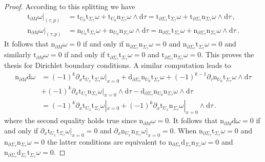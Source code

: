 \begin{proof}
	According to this splitting we have
	\begin{align*}
	\mathrm{t}_{\partial M}\omega|_{(\tau,p)}&=
	\mathrm{t}_{U_0}\mathrm{t}_{\Sigma_\tau}\omega+
	\mathrm{t}_{U_0}\mathrm{n}_{\Sigma_\tau}\omega\wedge\mathrm{d}\tau=
	\mathrm{t}_{\partial\Sigma_\tau}\mathrm{t}_{\Sigma_\tau}\omega+
	\mathrm{t}_{\partial\Sigma_\tau}\mathrm{n}_{\Sigma_\tau}\omega\wedge\mathrm{d}\tau\,,\\
	\mathrm{n}_{\partial M}\omega|_{(\tau,p)}&=
	\mathrm{n}_{U_0}\mathrm{t}_{\Sigma_{\tau}}\omega+
	\mathrm{n}_{U_0}\mathrm{n}_{\Sigma_\tau}\omega\wedge\mathrm{d}\tau=
	\mathrm{n}_{\partial\Sigma_\tau}\mathrm{t}_{\Sigma_\tau}\omega+
	\mathrm{n}_{\partial\Sigma_\tau}\mathrm{n}_{\Sigma_\tau}\omega\wedge\mathrm{d}\tau\,.
	\end{align*}
	It follows that $\mathrm{n}_{\partial M}\omega=0$ if and only if $\mathrm{n}_{\partial\Sigma_\tau}\mathrm{n}_{\Sigma_\tau}\omega=0$ and $\mathrm{n}_{\partial\Sigma_\tau}\mathrm{t}_{\Sigma_\tau}\omega=0$ and similarly $\mathrm{t}_{\partial M}\omega=0$ if and only if $\mathrm{t}_{\partial\Sigma_\tau}\mathrm{t}_{\Sigma_\tau}\omega=0$ and $\mathrm{t}_{\partial\Sigma_\tau}\mathrm{n}_{\Sigma_\tau}\omega=0$. This proves the thesis for Dirichlet boundary conditions. A similar computation leads to
	\begin{align*}
	\mathrm{n}_{\partial M}\mathrm{d}\omega&=
	(-1)^k\partial_x\mathrm{t}_{U_x}\mathrm{t}_{\Sigma_\tau}\omega|_{x=0}+
	\mathrm{d}_{\partial\Sigma_\tau}\mathrm{n}_{U_0}\mathrm{t}_{\Sigma_\tau}\omega+
	(-1)^{k-1}\partial_\tau\mathrm{n}_{U_0}\mathrm{t}_{\Sigma_\tau}\omega\wedge\mathrm{d}\tau\\&+
	(-1)^k\partial_x\mathrm{t}_{U_x}\mathrm{n}_{\Sigma_\tau}\omega|_{x=0}\wedge\mathrm{d}\tau-
	\mathrm{d}_{\partial\Sigma_\tau}\mathrm{n}_{U_0}\mathrm{n}_{\Sigma_\tau}\omega\wedge\mathrm{d}\tau\\&=
	(-1)^k\partial_x\mathrm{t}_{U_x}\mathrm{t}_{\Sigma_\tau}\omega|_{x=0}+
	(-1)^k\partial_x\mathrm{t}_{U_x}\mathrm{n}_{\Sigma_\tau}\omega|_{x=0}\wedge\mathrm{d}\tau\,.
	\end{align*}
	where the second equality holds true since $\mathrm{n}_{\partial M}\omega=0$.
	It follows that $\mathrm{n}_{\partial M}\mathrm{d}\omega=0$ if and only if $\partial_x\mathrm{t}_{U_x}\mathrm{t}_{\Sigma_\tau}\omega|_{x=0}=0$ and $\partial_x\mathrm{n}_{U_x}\mathrm{n}_{\Sigma_\tau}\omega|_{x=0}=0$.
	When $\mathrm{n}_{\partial\Sigma_\tau}\mathrm{t}_{\Sigma_\tau}\omega=0$ and $\mathrm{n}_{\partial\Sigma_\tau}\mathrm{n}_ {\Sigma_\tau}\omega=0$ the latter conditions are equivalent to $\mathrm{n}_{\partial\Sigma_\tau}\mathrm{d}_{\Sigma_\tau}\mathrm{n}_{\Sigma_\tau}\omega=0$ and $\mathrm{n}_{\partial\Sigma_\tau}\mathrm{d}_{\Sigma_\tau}\mathrm{t}_{\Sigma_\tau}\omega=0$.
\end{proof}

